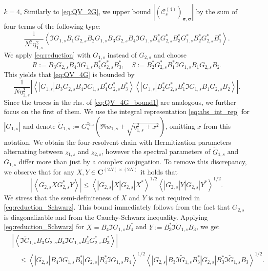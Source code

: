 \documentclass[10pt]{amsart}
\numberwithin{equation}{section}
\newcommand{\C}{\mathbf{C}}
\begin{document}
\medskip


\noindent\underline{$k=4$.} Similarly to \eqref{eq:QV_2G}, we upper bound $|(\mathcal{C}^{(4)}_s)_{\bm{\sigma},\bm{\sigma}}|$ by the sum of four terms of the following type:
\begin{equation}
\frac{1}{N^2\eta_{1,s}^2} \left\langle \Im G_{1,s} B_1G_{2,s}B_2G_{1,s}B_3G_{2,s}B_4\Im G_{1,s} B_4^* G_{2,s}^* B_3^* G_{1,s}^* B_2^* G_{2,s}^* B_1^*\right\rangle.
\label{eq:QV_4G}
\end{equation}
We apply \eqref{eq:reduction} with $G_{1,s}$ instead of $G_{2,s}$ and choose
\begin{equation}
R:=B_3G_{2,s}B_4\Im G_{1,s} B_4^*G_{2,s}^*B_3^*,\quad S:=B_2^*G_{2,s}^*B_1^*\Im G_{1,s} B_1G_{2,s} B_2.
\end{equation}
This yields that \eqref{eq:QV_4G} is bounded by
\begin{equation}
\frac{1}{N\eta_{1,s}^2} \left\vert \left\langle |G_{1,s}| B_3G_{2,s}B_4\Im G_{1,s} B_4^*G_{2,s}^*B_3^*\right\rangle \left\langle |G_{1,s}| B_2^*G_{2,s}^*B_1^*\Im G_{1,s} B_1G_{2,s} B_2\right\rangle\right\vert.
\label{eq:QV_4G_bound1}
\end{equation}
Since the traces in the rhs. of \eqref{eq:QV_4G_bound1} are analogous, we further focus on the first of them. We use the integral representation \eqref{eq:abs_int_rep} for $|G_{1,s}|$ and denote $\widetilde{G}_{1,s}:=G^{z_{1,s}}_s \left(\Re w_{1,s} +\sqrt{\eta_{1,s}^2 +x^2}\right)$, omitting $x$ from this notation. We obtain the four-resolvent chain with Hermitization parameters alternating between $z_{1,s}$ and $z_{2,s}$, however the spectral parameters of $\widetilde{G}_{1,s}$ and $G_{1,s}$ differ more than just by a complex conjugation. To remove this discrepancy, we observe that for any $X,Y\in \C^{(2N)\times (2N)}$ it holds that
\begin{equation}
\left\vert\left\langle G_{2,s}XG_{2,s}^*Y\right\rangle\right\vert \le \left\langle |G_{2,s}|X|G_{2,s}|X^*\right\rangle^{1/2} \left\langle |G_{2,s}|Y|G_{2,s}|Y^*\right\rangle^{1/2}.
\label{eq:reduction_Schwarz}
\end{equation}
We stress that the semi-definiteness of $X$ and $Y$ is not required in \eqref{eq:reduction_Schwarz}. This bound immediately follows from the fact that $G_{2,s}$ is diagonalizable and from the Cauchy-Schwarz inequality. Applying \eqref{eq:reduction_Schwarz} for $X=B_4\Im G_{1,s}B_4^*$ and $Y:=B_3^*\Im \widetilde{G}_{1,s}B_3$, we get
\begin{equation}
\begin{split}
&\left\vert\left\langle \Im \widetilde{G}_{1,s} B_3G_{2,s}B_4\Im G_{1,s} B_4^*G_{2,s}^*B_3^*\right\rangle\right\vert\\
&\quad \le \left\langle |G_{2,s}| B_4\Im G_{1,s}B_4^*|G_{2,s}| B_4^*\Im G_{1,s}B_4\right\rangle^{1/2}\left\langle |G_{2,s}| B_3\Im \widetilde{G}_{1,s}B_3^*|G_{2,s}| B_3^*\Im \widetilde{G}_{1,s}B_3\right\rangle^{1/2}.
\end{split}
\label{eq:QV_4G_bound2}
\end{equation}
\end{document}

